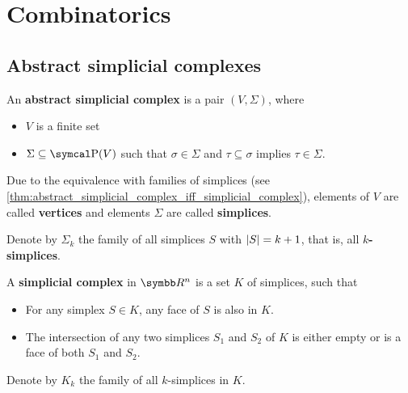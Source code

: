 \section{Combinatorics}\label{sec:combinatorics}
\subsection{Abstract simplicial complexes}\label{subsec:abstract_simplicial_complexes}

\begin{definition}\label{def:abstract_simplicial_complex}\cite[definition 2.1]{Carlsson2009}
  An \textbf{abstract simplicial complex} is a pair \( (V, \Sigma) \), where
  \begin{itemize}
    \item \( V \) is a finite set
    \item \( \Sigma \subseteq \Power(V) \) such that \( \sigma \in \Sigma \) and \( \tau \subseteq \sigma \) implies \( \tau \in \Sigma \).
  \end{itemize}

  Due to the equivalence with families of simplices (see \cref{thm:abstract_simplicial_complex_iff_simplicial_complex}), elements of \( V \) are called \textbf{vertices} and elements \( \Sigma \) are called \textbf{simplices}.

  Denote by \( \Sigma_k \) the family of all simplices \( S \) with \( \left\vert S \right\vert = k + 1 \), that is, all \textbf{\( k \)-simplices}.
\end{definition}

\begin{definition}\label{def:simplicial_complex}
  A \textbf{simplicial complex} in \( \R^n \) is a set \( K \) of simplices, such that
  \begin{itemize}
    \item For any simplex \( S \in K \), any face of \( S \) is also in \( K \).
    \item The intersection of any two simplices \( S_1 \) and \( S_2 \) of \( K \) is either empty or is a face of both \( S_1 \) and \( S_2 \).
  \end{itemize}

  Denote by \( K_k \) the family of all \( k \)-simplices in \( K \).
\end{definition}

